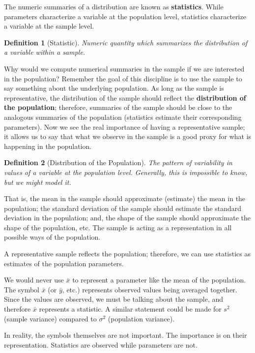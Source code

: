 \documentclass[
]{book}
\theoremstyle{plain}
\theoremstyle{mydefn}
\newtheorem{definition}{Definition}[chapter]
\theoremstyle{myexmpl}
\theoremstyle{remark}
\begin{document}
The numeric summaries of a distribution are known as \textbf{statistics}. While parameters characterize a variable at the population level, statistics characterize a variable at the sample level.

\begin{definition}[Statistic]
\protect\hypertarget{def:defn-statistic}{}{\label{def:defn-statistic} {} }Numeric quantity which summarizes the distribution of a variable within a \emph{sample}.
\end{definition}

Why would we compute numerical summaries in the sample if we are interested in the population? Remember the goal of this discipline is to use the sample to say something about the underlying population. As long as the sample is representative, the distribution of the sample should reflect the \textbf{distribution of the population}; therefore, summaries of the sample should be close to the analogous summaries of the population (statistics estimate their corresponding parameters). Now we see the real importance of having a representative sample; it allows us to say that what we observe in the sample is a good proxy for what is happening in the population.

\begin{definition}[Distribution of the Population]
\protect\hypertarget{def:defn-distribution-population}{}{\label{def:defn-distribution-population} {} }The pattern of variability in values of a variable at the population level. Generally, this is impossible to know, but we might model it.
\end{definition}

That is, the mean in the sample should approximate (estimate) the mean in the population; the standard deviation of the sample should estimate the standard deviation in the population; and, the shape of the sample should approximate the shape of the population, etc. The sample is acting as a representation in all possible ways of the population.

\begin{rmdkeyidea}
A representative sample reflects the population; therefore, we can use statistics as estimates of the population parameters.
\end{rmdkeyidea}

\begin{rmdtip}
We would never use \(\bar{x}\) to represent a parameter like the mean of the population. The symbol \(\bar{x}\) (or \(\bar{y}\), etc.) represents observed values being averaged together. Since the values are observed, we must be talking about the sample, and therefore \(\bar{x}\) represents a statistic. A similar statement could be made for \(s^2\) (sample variance) compared to \(\sigma^2\) (population variance).

In reality, the symbols themselves are not important. The importance is on their representation. Statistics are observed while parameters are not.
\end{rmdtip}
\end{document}
